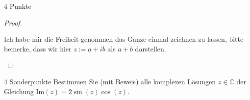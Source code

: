 \documentclass{problemset}
\begin{document}
\begin{problem}[Einheitskreis]{4 Punkte}
\begin{proof}
\begin{enumerate}
              Ich habe mir die Freiheit genommen das Ganze einmal zeichnen zu
              lassen, bitte bemerke, dass wir hier $z := a + ib$ als $a + b$
              darstellen.


    \end{enumerate}
\end{proof}
\end{problem}

\begin{problem}{4 Sonderpunkte}
Bestimmen Sie (mit Beweis) alle komplexen Lösungen $z \in \mathbb{C}$ der Gleichung $\text{Im}(z) = 2\sin(z)\cos(z)$.
\end{problem}
\end{document}
